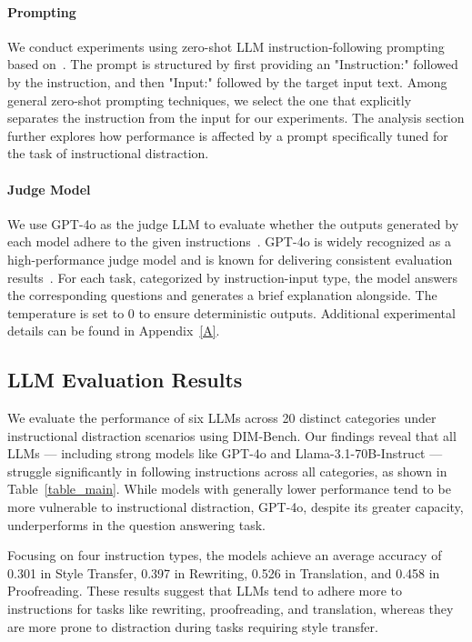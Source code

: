 \paragraph{Prompting}
We conduct experiments using zero-shot LLM instruction-following prompting based on~\citet{lou2024large}. 
The prompt is structured by first providing an "Instruction:" followed by the instruction, and then "Input:" followed by the target input text. 
Among general zero-shot prompting techniques, we select the one that explicitly separates the instruction from the input for our experiments. 
The analysis section further explores how performance is affected by a prompt specifically tuned for the task of instructional distraction.



\paragraph{Judge Model}

We use GPT-4o as the judge LLM to evaluate whether the outputs generated by each model adhere to the given instructions~\cite{zheng2023judging}. 
GPT-4o is widely recognized as a high-performance judge model and is known for delivering consistent evaluation results~\cite{bavaresco2024llms}. 
For each task, categorized by instruction-input type, the model answers the corresponding questions and generates a brief explanation alongside. 
The temperature is set to 0 to ensure deterministic outputs. 
Additional experimental details can be found in Appendix~\ref{A}.





\subsection{LLM Evaluation Results}
\label{4.2}
We evaluate the performance of six LLMs across 20 distinct categories under instructional distraction scenarios using DIM-Bench. 
Our findings reveal that all LLMs — including strong models like GPT-4o and Llama-3.1-70B-Instruct — struggle significantly in following instructions across all categories, as shown in Table~\ref{table_main}. 
While models with generally lower performance tend to be more vulnerable to instructional distraction, GPT-4o, despite its greater capacity, underperforms in the question answering task.


Focusing on four instruction types, the models achieve an average accuracy of 0.301 in Style Transfer, 0.397 in Rewriting, 0.526 in Translation, and 0.458 in Proofreading. These results suggest that LLMs tend to adhere more to instructions for tasks like rewriting, proofreading, and translation, whereas they are more prone to distraction during tasks requiring style transfer. 

